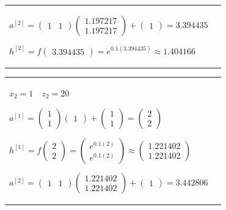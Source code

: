 \documentclass[11pt,a4paper]{article}
\begin{document}
\begin{flushleft}
\begin{tabularx}{1.09\textwidth}{X X}
  $ a^{[2]} = \begin{pmatrix} 1 & 1 \end{pmatrix} \begin{pmatrix} 1.197217 \\ 1.197217 \end{pmatrix} + \begin{pmatrix} 1 \end{pmatrix} = 3.394435 $ \par \vspace{1mm}
  $ h^{[2]} = f \begin{pmatrix} 3.394435 \end{pmatrix} = e^{0.1(3.394435)} \approx 1.404166 $ \par \vspace{1mm}
\end{tabularx}
\begin{tabularx}{1.09\textwidth}{X X}
  $ \boxed{x_2 = 1} \quad z_2 = 20 $ \par \vspace{1mm}
  $ a^{[1]} = \begin{pmatrix} 1 \\ 1 \end{pmatrix} \begin{pmatrix} 1 \end{pmatrix} + \begin{pmatrix} 1 \\ 1 \end{pmatrix} = \begin{pmatrix} 2 \\ 2 \end{pmatrix} $ \par \vspace{1mm}
  $ h^{[1]} = f \begin{pmatrix} 2 \\ 2 \end{pmatrix} = \begin{pmatrix} e^{0.1(2)} \\ e^{0.1(2)} \end{pmatrix} \approx \begin{pmatrix} 1.221402 \\ 1.221402 \end{pmatrix} $ \par \vspace{1mm}
  $ a^{[2]} = \begin{pmatrix} 1 & 1 \end{pmatrix} \begin{pmatrix} 1.221402 \\ 1.221402 \end{pmatrix} + \begin{pmatrix} 1 \end{pmatrix} = 3.442806 $ \par \vspace{1mm}

\end{tabularx}
\end{flushleft}
\end{document}
